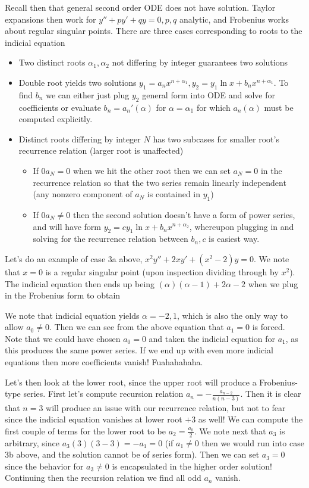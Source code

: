 \documentclass[10pt]{report}
\begin{document}
Recall then that general second order ODE does not have solution. Taylor expansions then work for $y'' + py' + qy = 0, p,q$ analytic, and Frobenius works about regular singular points. There are three cases corresponding to roots to the indicial equation
\begin{itemize}
    \item Two distinct roots $\alpha_1, \alpha_2$ not differing by integer guarantees two solutions
    \item Double root yields two solutions $y_1 = a_n x^{n + \alpha_1}, y_2 = y_1\ln x + b_n x^{n + \alpha_1}$. To find $b_n$ we can either just plug $y_2$ general form into ODE and solve for coefficients or evaluate $b_n = a_n'(\alpha)$ for $\alpha = \alpha_1$ for which $a_n(\alpha)$ must be computed explicitly.
    \item Distinct roots differing by integer $N$ has two subcases for smaller root's recurrence relation (larger root is unaffected)
        \begin{itemize}
            \item If $0 a_N = 0$ when we hit the other root then we can set $a_N = 0$ in the recurrence relation so that the two series remain linearly independent (any nonzero component of $a_N$ is contained in $y_1$)
            \item If $0 a_N \neq 0$ then the second solution doesn't have a form of power series, and will have form $y_2 = cy_1\ln x + b_n x^{n + \alpha_2}$, whereupon plugging in and solving for the recurrence relation between $b_n, c$ is easiest way.
        \end{itemize}
\end{itemize}

Let's do an example of case 3a above, $x^2 y'' + 2xy' + (x^2 - 2)y = 0$. We note that $x=0$ is a regular singular point (upon inspection dividing through by $x^2$). The indicial equation then ends up being $(\alpha)(\alpha - 1) + 2\alpha - 2$ when we plug in the Frobenius form to obtain

We note that indicial equation yields $\alpha = -2, 1$, which is also the only way to allow $a_0 \neq 0$. Then we can see from the above equation that $a_1 = 0$ is forced. Note that we could have chosen $a_0 = 0$ and taken the indicial equation for $a_1$, as this produces the same power series. If we end up with even more indicial equations then more coefficients vanish! Fuahahahaha.

Let's then look at the lower root, since the upper root will produce a Frobenius-type series. First let's compute recursion relation $a_n = -\frac{a_{n-2}}{n(n-3)}$. Then it is clear that $n=3$ will produce an issue with our recurrence relation, but not to fear since the indicial equation vanishes at lower root $+3$ as well! We can compute the first couple of terms for the lower root to be $a_2 = \frac{a_0}{2}$. We note next that $a_3$ is arbitrary, since $a_3(3)(3-3) = -a_1 = 0$ (if $a_1 \neq 0$ then we would run into case 3b above, and the solution cannot be of series form). Then we can set $a_3 = 0$ since the behavior for $a_3 \neq 0$ is encapsulated in the higher order solution! Continuing then the recursion relation we find all odd $a_n$ vanish. 
\end{document}
